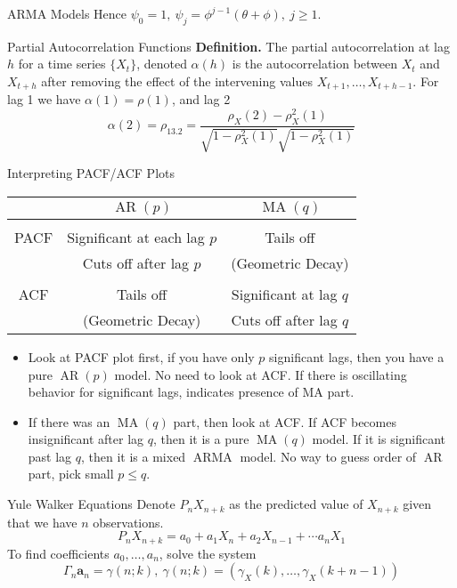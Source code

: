\documentclass{article}
\DeclareMathOperator{\arma}{ARMA}
\DeclareMathOperator{\ar}{AR}
\DeclareMathOperator{\ma}{MA}
\begin{document}
\begin{multicols*}{3}
\begin{blackbox}{ARMA Models}
    Hence $\psi_0 = 1, \ \psi_j = \phi^{j-1}(\theta + \phi), \ j \geq 1$.
\end{blackbox}
\begin{blackbox}{Partial Autocorrelation Functions}
    \textbf{Definition.} The partial autocorrelation at lag $h$ for a time series $\{X_t\}$, denoted $\alpha(h)$ is the autocorrelation between $X_t$ and $X_{t+h}$ after removing the effect of the intervening values $X_{t+1}, \ldots, X_{t+h-1}$. For lag 1 we have $\alpha(1) = \rho(1)$, and lag 2\\[-3ex]
    \[\alpha(2) = \rho_{13.2} = \frac{\rho_X(2) - \rho_X^2(1)}{\sqrt{1-\rho_X^2(1)}\sqrt{1-\rho_X^2(1)}}\]
\end{blackbox}
\begin{blackbox}{Interpreting PACF/ACF Plots}
    \begin{center}
        \begin{tabular}{c|c|c}
            & $\ar(p)$ & $\ma(q)$\\ 
            \hline
            & &  \\
            PACF & Significant at each lag $p$ & Tails off \\
            & Cuts off after lag $p$ & (Geometric Decay) \\
            \hline
            & & \\
        ACF & Tails off & Significant at lag $q$ \\
        &  (Geometric Decay) & Cuts off after lag $q$ \\
        \end{tabular}
    \end{center}
    \begin{itemize}[leftmargin=5pt]
        \item Look at PACF plot first, if you have only $p$ significant lags, then you have a pure $\ar(p)$ model. No need to look at ACF. If there is oscillating behavior for significant lags, indicates presence of MA part. 
        \item If there was an $\ma(q)$ part, then look at ACF. If ACF becomes insignificant after lag $q$, then it is a pure $\ma(q)$ model. If it is significant past lag $q$, then it is a mixed $\arma$ model. No way to guess order of $\ar$ part, pick small $p \leq q$.
    \end{itemize}
\end{blackbox}

\begin{blackbox}{Yule Walker Equations}
    Denote $P_{n}X_{n+k}$ as the predicted value of $X_{n+k}$ given that we have $n$ observations.\\[-3ex] 
    \[P_nX_{n+k} = a_0 + a_1X_{n} + a_2X_{n-1} + \cdots a_nX_1\]  
    To find coefficients $a_0,\ldots, a_n$, solve the system \\[-4ex]
    \[\Gamma_n\textbf{a}_n = \gamma(n;k), \ \gamma(n;k) = \left(\gamma_X(k), \ldots, \gamma_X(k+n-1)\right)\]
    \vspace{-7ex}


\end{blackbox}
\end{multicols*}
\end{document}
